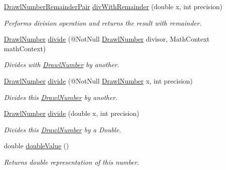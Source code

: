 \begin{DoxyCompactItemize}
\hyperlink{classcom_1_1aarrelaakso_1_1drawl_1_1_drawl_number_remainder_pair}{Drawl\+Number\+Remainder\+Pair} \hyperlink{classcom_1_1aarrelaakso_1_1drawl_1_1_drawl_number_a99090eea8ac1be98cf40ef75f8eed090}{div\+With\+Remainder} (double x, int precision)
\begin{DoxyCompactList}\small\item\em Performs division operation and returns the result with remainder. \end{DoxyCompactList}\item 
\hyperlink{classcom_1_1aarrelaakso_1_1drawl_1_1_drawl_number}{Drawl\+Number} \hyperlink{classcom_1_1aarrelaakso_1_1drawl_1_1_drawl_number_ac5c959677fa71d3303a9cb329f943cbc}{divide} (@Not\+Null \hyperlink{classcom_1_1aarrelaakso_1_1drawl_1_1_drawl_number}{Drawl\+Number} divisor, Math\+Context math\+Context)
\begin{DoxyCompactList}\small\item\em Divides with \hyperlink{classcom_1_1aarrelaakso_1_1drawl_1_1_drawl_number}{Drawl\+Number} by another. \end{DoxyCompactList}\item 
\hyperlink{classcom_1_1aarrelaakso_1_1drawl_1_1_drawl_number}{Drawl\+Number} \hyperlink{classcom_1_1aarrelaakso_1_1drawl_1_1_drawl_number_ae3f1338acaa167edcc345c7be3a48aec}{divide} (@Not\+Null \hyperlink{classcom_1_1aarrelaakso_1_1drawl_1_1_drawl_number}{Drawl\+Number} x, int precision)
\begin{DoxyCompactList}\small\item\em Divides this \hyperlink{classcom_1_1aarrelaakso_1_1drawl_1_1_drawl_number}{Drawl\+Number} by another. \end{DoxyCompactList}\item 
\hyperlink{classcom_1_1aarrelaakso_1_1drawl_1_1_drawl_number}{Drawl\+Number} \hyperlink{classcom_1_1aarrelaakso_1_1drawl_1_1_drawl_number_aaefd2f03c90250ae78a0baaea1c468d4}{divide} (double x, int precision)
\begin{DoxyCompactList}\small\item\em Divides this \hyperlink{classcom_1_1aarrelaakso_1_1drawl_1_1_drawl_number}{Drawl\+Number} by a Double. \end{DoxyCompactList}\item 
double \hyperlink{classcom_1_1aarrelaakso_1_1drawl_1_1_drawl_number_af5e6d77e51e7b6167d18acec2eb26877}{double\+Value} ()
\begin{DoxyCompactList}\small\item\em Returns double representation of this number. \end{DoxyCompactList}\item 

\end{DoxyCompactItemize}
